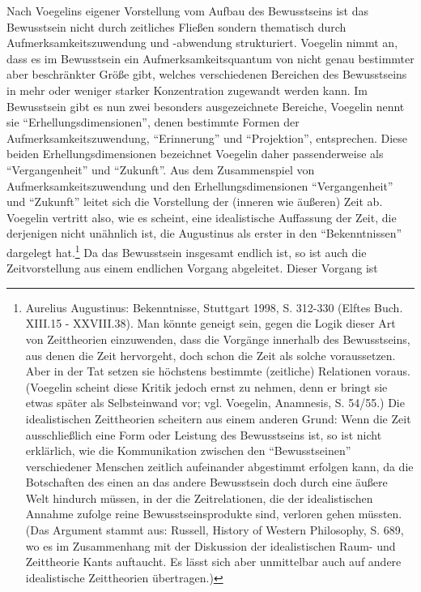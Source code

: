 Nach Voegelins eigener Vorstellung vom Aufbau des Bewusstseins ist das
Bewusstsein nicht durch zeitliches Fließen sondern thematisch durch
Aufmerksamkeitszuwendung und -abwendung strukturiert. Voegelin nimmt an, dass
es im Bewusstsein ein Aufmerksamkeitsquantum von nicht genau bestimmter aber
beschränkter Größe gibt, welches verschiedenen Bereichen des Bewusstseins in
mehr oder weniger starker Konzentration zugewandt werden kann. Im Bewusstsein
gibt es nun zwei besonders ausgezeichnete Bereiche, Voegelin nennt sie
"`Erhellungsdimensionen"', denen bestimmte Formen der
Aufmerksamkeitszuwendung, "`Erinnerung"' und "`Projektion"', entsprechen.
Diese beiden Erhellungsdimensionen bezeichnet Voegelin daher passenderweise
als "`Vergangenheit"' und "`Zukunft"'. Aus dem Zusammenspiel von
Aufmerksamkeitszuwendung und den Erhellungsdimensionen "`Vergangenheit"' und
"`Zukunft"' leitet sich die Vorstellung der (inneren wie äußeren) Zeit ab.
Voegelin vertritt also, wie es scheint, eine idealistische Auffassung der
Zeit, die derjenigen nicht unähnlich ist, die Augustinus als erster in den
"`Bekenntnissen"' dargelegt hat.\footnote{Aurelius Augustinus: Bekenntnisse,
  Stuttgart 1998, S. 312-330 (Elftes Buch. XIII.15 - XXVIII.38). Man könnte
  geneigt sein, gegen die Logik dieser Art von Zeittheorien einzuwenden, dass
  die Vorgänge innerhalb des Bewusstseins, aus denen die Zeit hervorgeht, doch
  schon die Zeit als solche voraussetzen. Aber in der Tat setzen sie höchstens
  bestimmte (zeitliche) Relationen voraus.  (Voegelin scheint diese Kritik
  jedoch ernst zu nehmen, denn er bringt sie etwas später als Selbsteinwand
  vor; vgl. Voegelin, Anamnesis, S. 54/55.) Die idealistischen Zeittheorien
  scheitern aus einem anderen Grund: Wenn die Zeit ausschließlich eine Form
  oder Leistung des Bewusstseins ist, so ist nicht erklärlich, wie die
  Kommunikation zwischen den "`Bewusstseinen"' verschiedener Menschen zeitlich
  aufeinander abgestimmt erfolgen kann, da die Botschaften des einen an das
  andere Bewusstsein doch durch eine äußere Welt hindurch müssen, in der die
  Zeitrelationen, die der idealistischen Annahme zufolge reine
  Bewusstseinsprodukte sind, verloren gehen müssten. (Das Argument stammt aus:
  Russell, History of Western Philosophy, S. 689, wo es im Zusammenhang mit der
  Diskussion der idealistischen Raum- und Zeittheorie Kants auftaucht. Es
  lässt sich aber unmittelbar auch auf andere idealistische Zeittheorien
  übertragen.)} Da das Bewusstsein insgesamt endlich ist, so ist auch die
Zeitvorstellung aus einem endlichen Vorgang abgeleitet.  Dieser Vorgang ist
